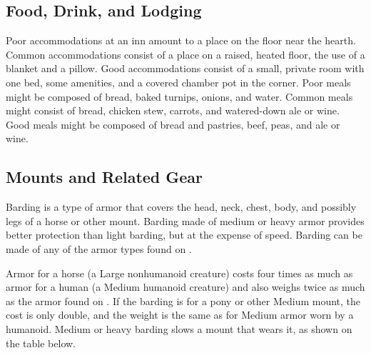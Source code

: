     \subsection{Food, Drink, and Lodging}
         Poor accommodations at an inn amount to a place on the floor near the hearth. Common accommodations consist of a place on a raised, heated floor, the use of a blanket and a pillow. Good accommodations consist of a small, private room with one bed, some amenities, and a covered chamber pot in the corner.
         Poor meals might be composed of bread, baked turnips, onions, and water. Common meals might consist of bread, chicken stew, carrots, and watered-down ale or wine. Good meals might be composed of bread and pastries, beef, peas, and ale or wine.

    \subsection{Mounts and Related Gear}
         Barding is a type of armor that covers the head, neck, chest, body, and possibly legs of a horse or other mount. Barding made of medium or heavy armor provides better protection than light barding, but at the expense of speed. Barding can be made of any of the armor types found on .
        \par Armor for a horse (a Large nonhumanoid creature) costs four times as much as armor for a human (a Medium humanoid creature) and also weighs twice as much as the armor found on . If the barding is for a pony or other Medium mount, the cost is only double, and the weight is the same as for Medium armor worn by a humanoid. Medium or heavy barding slows a mount that wears it, as shown on the table below.

